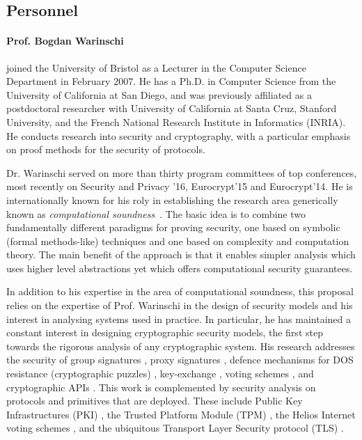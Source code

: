 
\subsection{Personnel}
\label{sec:prev_people}
\fi

\paragraph{Prof. Bogdan Warinschi} joined the University of 
Bristol as a Lecturer in the Computer Science Department in February 2007. 
He has a Ph.D. in Computer Science from the University of California
at San Diego, and was previously affiliated as a postdoctoral researcher with
University of California at Santa Cruz, Stanford University, and the
French National Research Institute in Informatics (INRIA).
He conducts research into security and cryptography, with a particular emphasis on
proof methods for the security of protocols.


Dr. Warinschi served on more than thirty program committees of top conferences, most recently on Security and Privacy '16, Eurocrypt'15 and Eurocrypt'14.  He is internationally known for his roly in establishing the research area generically known as {\em computational   soundness}~\cite{cortier05computationally,micciancio04soundness}.
The basic idea is to combine two fundamentally different paradigms for proving security, one based on symbolic (formal methods-like) techniques and one based on complexity and computation theory. 
The main benefit of the approach is that it enables simpler analysis which uses higher level abstractions yet which offers computational security guarantees. 

In addition to his expertise in the area of computational soundness, this proposal relies on the expertise of Prof. Warinschi in the design of security models and his interest in analysing systems used in practice. In particular, he has maintained a constant interest in designing cryptographic security models, the first step towards the rigorous analysis of any cryptographic system. 
His research addresses the security of group signatures \cite{BMW03}, proxy signatures \cite{proxies}, defence mechanisms for DOS resistance (cryptographic puzzles) \cite{puzzles},  key-exchange \cite{ke}, voting schemes \cite{helios}, and cryptographic APIs \cite{KSW11}.
This work is complemented by security analysis on protocols and primitives that are deployed.   These include Public Key Infrastructures (PKI) \cite{boldyreva07acloser}, the Trusted Platform Module (TPM) \cite{pcas}, the Helios Internet voting schemes \cite{helios}, and the ubiquitous Transport Layer Security protocol (TLS) \cite{tls}. 

